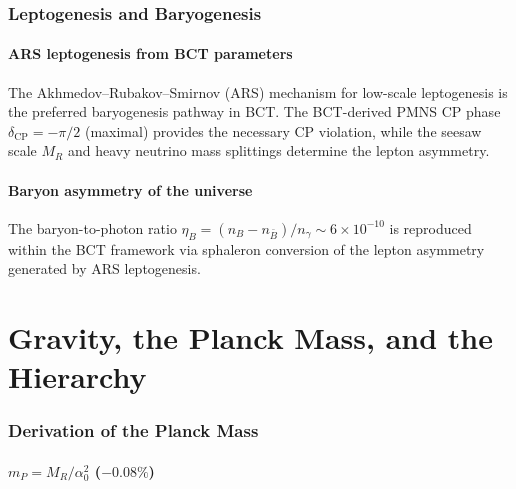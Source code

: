 \documentclass[review,number,sort&compress]{elsarticle}
\newcommand{\azero}{\alpha_0}
\newcommand{\MR}{M_R}
\newcommand{\mP}{m_P}
\begin{document}
\section{Leptogenesis and Baryogenesis}
\label{sec:leptogenesis}

\subsection{ARS leptogenesis from BCT parameters}

The Akhmedov--Rubakov--Smirnov (ARS) mechanism for low-scale leptogenesis
is the preferred baryogenesis pathway in BCT. The BCT-derived PMNS CP
phase $\delta_{\mathrm{CP}} = -\pi/2$ (maximal) provides the necessary
CP violation, while the seesaw scale $\MR$ and heavy neutrino mass
splittings determine the lepton asymmetry.

\subsection{Baryon asymmetry of the universe}

The baryon-to-photon ratio $\eta_B = (n_B - n_{\bar{B}})/n_\gamma
\sim 6 \times 10^{-10}$ is reproduced within the BCT framework via
sphaleron conversion of the lepton asymmetry generated by ARS
leptogenesis.



\part{Gravity, the Planck Mass, and the Hierarchy}
\label{part:gravity}

\section{Derivation of the Planck Mass}
\label{sec:planck}

\subsection{$\mP = \MR/\azero^2$ ($-0.08\%$)}
\end{document}
